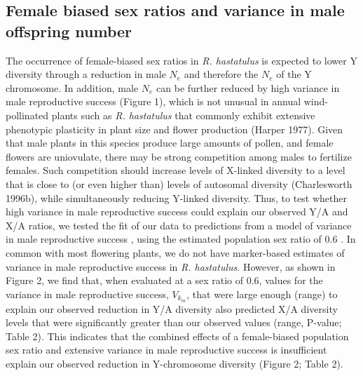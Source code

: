 \documentclass[9pt,twocolumn,twoside]{gsajnl}
\begin{document}

\subsection*{Female biased sex ratios and variance in male offspring number}
The occurrence of female-biased sex ratios in \textit{R. hastatulus} is expected to lower Y diversity through a reduction in male $N_{e}$ and therefore the $N_{e}$ of the Y chromosome. In addition, male $N_{e}$ can be further reduced by high variance in male reproductive success (Figure 1), which is not unusual in annual wind-pollinated plants such as \textit{R. hastatulus} that commonly exhibit extensive phenotypic plasticity in plant size and flower production (\X Harper 1977). Given that male plants in this species produce large amounts of pollen, and female flowers are uniovulate, there may be strong competition among males to fertilize females. Such competition should increase levels of X-linked diversity to a level that is close to (or even higher than) levels of autosomal diversity (Charlesworth 1996b), while simultaneously reducing Y-linked diversity. Thus, to test whether high variance in male reproductive success could explain our observed Y/A and X/A ratios, we tested the fit of our data to predictions from a model of variance in male reproductive success \citep{kimura1964number}, using the estimated population sex ratio of 0.6 \citep{pickup2013influence}. In common with most flowering plants, we do not have marker-based estimates of variance in male reproductive success in \textit{R. hastatulus}. However, as shown in Figure 2, we find that, when evaluated at a sex ratio of 0.6, values for the variance in male reproductive success, $V_{k}_{m}$, that were large enough (range) to explain our observed reduction in Y/A diversity also predicted X/A diversity levels that were significantly greater than our observed values (range, P-value; Table 2). This indicates that the combined effects of a female-biased population sex ratio and extensive variance in male reproductive success is insufficient explain our observed  reduction in Y-chromosome diversity (Figure 2; Table 2).
\end{document}
